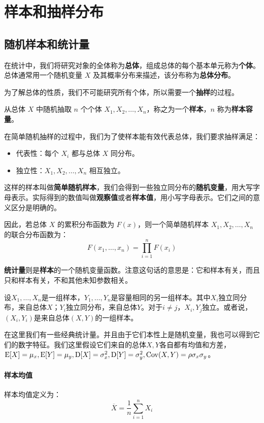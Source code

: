 
\section{样本和抽样分布}
\subsection{随机样本和统计量}
在统计中，我们将研究对象的全体称为\textbf{总体}，组成总体的每个基本单元称为\textbf{个体}。总体通常用一个随机变量 $X$ 及其概率分布来描述，该分布称为\textbf{总体分布}。

为了解总体的性质，我们不可能研究所有个体，所以需要一个\textbf{抽样}的过程。

从总体 $X$ 中随机抽取 $n$ 个个体 $X_1, X_2, \dots, X_n$，称之为一个\textbf{样本}，$n$ 称为\textbf{样本容量}。

在简单随机抽样的过程中，我们为了使样本能有效代表总体，我们要求抽样满足：
\begin{itemize}
    \item 代表性：每个 $X_i$ 都与总体 $X$ 同分布。
    \item 独立性：$X_1, X_2, \dots, X_n$ 相互独立。
\end{itemize}
        
这样的样本叫做\textbf{简单随机样本}，我们会得到一些独立同分布的\textbf{随机变量}，用大写字母表示。实际得到的数值叫做\textbf{观察值}或者\textbf{样本值}，用小写字母表示。它们之间的意义区分是明确的。

因此，若总体 $X$ 的累积分布函数为 $F(x)$，则一个简单随机样本 $X_1, X_2, \dots, X_n$ 的联合分布函数为：
\[
F(x_1,\ldots,x_n) = \prod_{i=1}^nF(x_i)
\]

\textbf{统计量}则是\textbf{样本}的一个随机变量函数。注意这句话的意思是：它和样本有关，而且只和样本有关，不和其他未知参数相关。

设$X_1,\ldots,X_n$是一组样本，$Y_1,\ldots,Y_n$是容量相同的另一组样本。其中$X_i$独立同分布，来自总体$X$；$Y_i$独立同分布，来自总体$Y$。对于$i\neq j$，$X_i,Y_j$独立。或者说，$(X_i,Y_i)$是来自总体$(X,Y)$的一组样本。

在这里我们有一些经典统计量。并且由于它们本性上是随机变量，我也可以得到它们的数字特征。我们这里假设它们来自的总体$X,Y$各自都有均值和方差，$\operatorname{E}[X]=\mu_x,\operatorname{E}[Y]=\mu_y, \operatorname{D}[X]=\sigma_x^2, \operatorname{D}[Y]=\sigma_y^2,\operatorname{Cov}(X,Y)=\rho\sigma_x\sigma_y$。

\paragraph{样本均值}
样本均值定义为：
\[
\overline{X}=\frac 1n\sum_{i=1}^nX_i
\]

